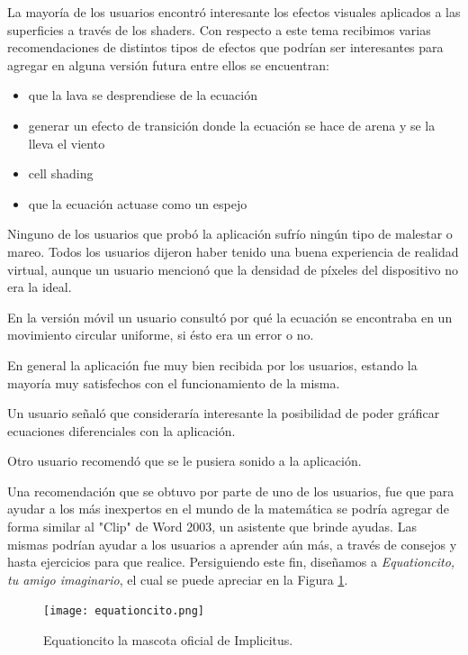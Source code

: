 \documentclass[12pt]{article}
\begin{document}
La mayoría de los usuarios encontró interesante los efectos visuales aplicados a las superficies a través de los shaders. Con respecto a este tema recibimos varias recomendaciones de distintos tipos de efectos que podrían ser interesantes para agregar en alguna versión futura entre ellos se encuentran: 
\begin{itemize}
\item que la lava se desprendiese de la ecuación
\item generar un efecto de transición donde la ecuación se hace de arena y se la lleva el viento
\item cell shading
\item que la ecuación actuase como un espejo
\end{itemize}
Ninguno de los usuarios que probó la aplicación sufrío ningún tipo de malestar o mareo. Todos los usuarios dijeron haber tenido una buena experiencia de realidad virtual, aunque un usuario mencionó que la densidad de píxeles del dispositivo no era la ideal.

En la versión móvil un usuario consultó por qué la ecuación se encontraba en un movimiento circular uniforme, si ésto era un error o no.

En general la aplicación fue muy bien recibida por los usuarios, estando la mayoría muy satisfechos con el funcionamiento de la misma.

Un usuario señaló que consideraría interesante la posibilidad de poder gráficar ecuaciones diferenciales con la aplicación. 

Otro usuario recomendó que se le pusiera sonido a la aplicación.

Una recomendación que se obtuvo por parte de uno de los usuarios, fue que para ayudar a los más inexpertos en el mundo de la matemática se podría agregar de forma similar al "Clip" de Word 2003, un asistente que brinde ayudas. Las mismas podrían ayudar a los usuarios a aprender aún más, a través de consejos y hasta ejercicios para que realice. Persiguiendo este fin, diseñamos a \textit{Equationcito, tu amigo imaginario}, el cual se puede apreciar en la Figura \ref{equationcito}.
\begin{figure}[h]
\texttt{[image: equationcito.png]}
\caption{Equationcito la mascota oficial de Implicitus.}
\label{equationcito}
\end{figure}
\clearpage
\end{document}
